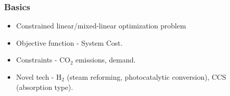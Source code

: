 \begin{frame}
  \frametitle{Basics}
        \begin{itemize}
        
        \item Constrained linear/mixed-linear optimization problem
        
        \item Objective function - System Cost.
        
        \item Constraints - CO$_2$ emissions, demand.
        
        \item Novel tech - H$_2$ (steam reforming, photocatalytic conversion), CCS (absorption type).
        
        \end{itemize}
\end{frame}
